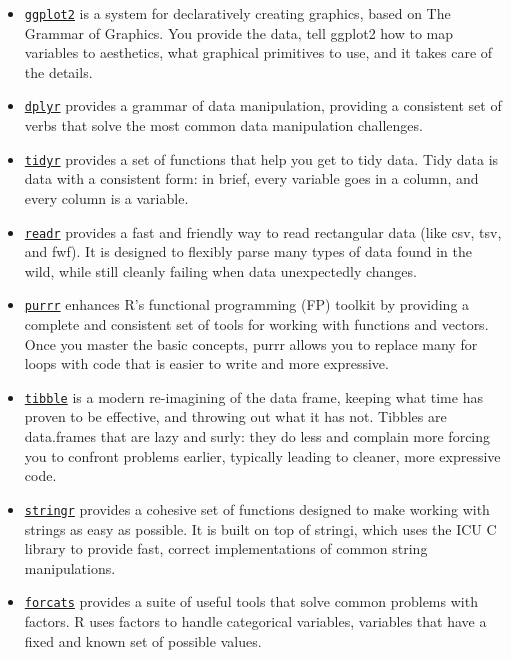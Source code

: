 \documentclass[
]{book}
\providecommand{\tightlist}{%
  \setlength{\itemsep}{0pt}\setlength{\parskip}{0pt}}
\begin{document}
\begin{itemize}
\tightlist
\item
  \href{https://ggplot2.tidyverse.org/}{\texttt{ggplot2}} is a system for declaratively creating graphics, based on The Grammar of Graphics. You provide the data, tell ggplot2 how to map variables to aesthetics, what graphical primitives to use, and it takes care of the details.
\item
  \href{https://dplyr.tidyverse.org/}{\texttt{dplyr}} provides a grammar of data manipulation, providing a consistent set of verbs that solve the most common data manipulation challenges.
\item
  \href{https://tidyr.tidyverse.org/}{\texttt{tidyr}} provides a set of functions that help you get to tidy data. Tidy data is data with a consistent form: in brief, every variable goes in a column, and every column is a variable.
\item
  \href{https://readr.tidyverse.org/}{\texttt{readr}} provides a fast and friendly way to read rectangular data (like csv, tsv, and fwf). It is designed to flexibly parse many types of data found in the wild, while still cleanly failing when data unexpectedly changes.
\item
  \href{https://purrr.tidyverse.org/}{\texttt{purrr}} enhances R's functional programming (FP) toolkit by providing a complete and consistent set of tools for working with functions and vectors. Once you master the basic concepts, purrr allows you to replace many for loops with code that is easier to write and more expressive.
\item
  \href{https://tibble.tidyverse.org/}{\texttt{tibble}} is a modern re-imagining of the data frame, keeping what time has proven to be effective, and throwing out what it has not. Tibbles are data.frames that are lazy and surly: they do less and complain more forcing you to confront problems earlier, typically leading to cleaner, more expressive code.
\item
  \href{https://stringr.tidyverse.org/}{\texttt{stringr}} provides a cohesive set of functions designed to make working with strings as easy as possible. It is built on top of stringi, which uses the ICU C library to provide fast, correct implementations of common string manipulations.
\item
  \href{https://forcats.tidyverse.org/}{\texttt{forcats}} provides a suite of useful tools that solve common problems with factors. R uses factors to handle categorical variables, variables that have a fixed and known set of possible values.
\end{itemize}
\end{document}

